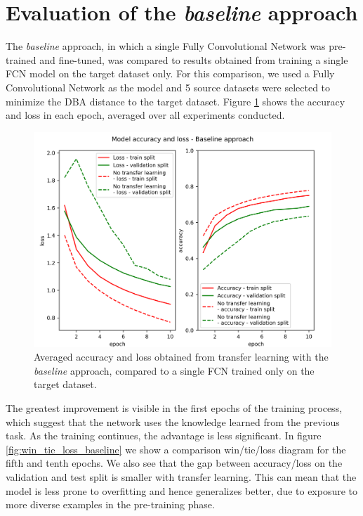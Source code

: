 \documentclass[a4paper,11pt,twoside]{report}
\theoremstyle{definition}
\begin{document}
\section{Evaluation of the \textit{baseline} approach}
The \textit{baseline} approach, in which a single Fully Convolutional Network was pre-trained and fine-tuned, was compared to results obtained from training a single FCN model on the target dataset only. For this comparison, we used a Fully Convolutional Network as the model and 5 source datasets were selected to minimize the DBA distance to the target dataset.  Figure \ref{fig:baseline_acc} shows the accuracy and loss in each epoch, averaged over all experiments conducted.


\FloatBarrier

\begin{figure}[h!t]
\centering
\includegraphics[width=17 cm]{imgs/baseline/loss_acc.png}
\caption{Averaged accuracy and loss obtained from transfer learning with the \textit{baseline} approach, compared to a single FCN trained only on the target dataset.}
\label{fig:baseline_acc}
\end{figure}
\FloatBarrier
The greatest improvement is visible in the first epochs of the training process, which suggest that the network uses the knowledge learned from the previous task. As the training continues, the advantage is less significant. In figure \ref{fig:win_tie_loss_baseline} we show a comparison win/tie/loss diagram for the fifth and tenth epochs.
We also see that the gap between accuracy/loss on the validation and test split is smaller with transfer learning. This can mean that the model is less prone to overfitting and hence generalizes better, due to exposure to more diverse examples in the pre-training phase.
\end{document}
